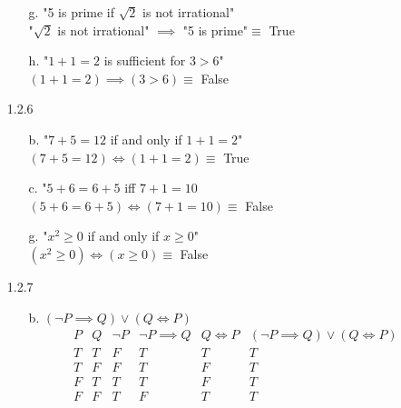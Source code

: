 \documentclass[11pt]{amsart}
\theoremstyle{definition}
\begin{document}
\begin{itemize}
\begin{itemize}
    \item[g.] "5 is prime if $\sqrt{2}$ is not irrational" \\
    "$\sqrt{2}$ is not irrational" $\implies$ "5 is prime"$\equiv$ True
    
    \item[h.] "$1+1=2$ is sufficient for $3>6$" \\
    $(1+1=2)\implies(3>6)\equiv$ False
    
\end{itemize}

\item[1.2.6]
\begin{itemize}
    \item[b.] "$7+5=12$ if and only if $1+1=2$" \\
    $(7+5=12)\iff(1+1=2)\equiv$ True

    \item[c.] "$5+6=6+5$ iff $7+1=10$ \\
    $(5+6=6+5)\iff(7+1=10)\equiv$ False

    \item[g.] "$x^2\ge 0$ if and only if $x\ge 0$" \\
    $(x^2\ge 0)\iff (x\ge 0)\equiv$ False
    
\end{itemize}

\item[1.2.7]
\begin{itemize}
    \item[b.] $(\neg P\implies Q)\lor(Q\iff P)$
    \begin{equation*}
    \begin{array}{cccccc}
        P & Q & \neg P & \neg P\implies Q & Q\iff P & (\neg P\implies Q)\lor(Q\iff P) \\
        T & T & F & T & T & T \\
        T & F & F & T & F & T \\
        F & T & T & T & F & T \\
        F & F & T & F & T & T
    \end{array}
    \end{equation*}


\end{itemize}
\end{itemize}
\end{document}
